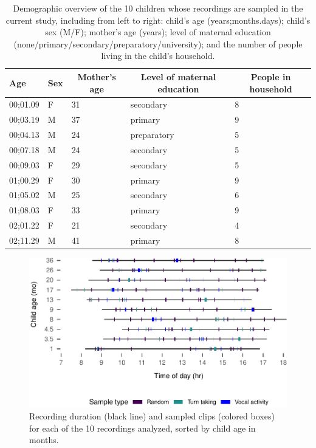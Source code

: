 \documentclass[,man,floatsintext]{apa6}
\begin{document}
\begin{table}[tbp]
\begin{center}
\begin{threeparttable}
\caption{\label{tab:tab1}Demographic overview of the 10 children whose recordings are sampled in the current study, including from left to right: child's age (years;months.days); child's sex (M/F); mother's age (years); level of maternal education (none/primary/secondary/preparatory/university); and the number of people living in the child's household.}
\begin{tabular}{lllll}
\toprule
Age & \multicolumn{1}{c}{Sex} & \multicolumn{1}{c}{Mother's age} & \multicolumn{1}{c}{Level of maternal education} & \multicolumn{1}{c}{People in household}\\
\midrule
00;01.09 & F & 31 & secondary & 8\\
00;03.19 & M & 37 & primary & 9\\
00;04.13 & M & 24 & preparatory & 5\\
00;07.18 & M & 24 & secondary & 5\\
00;09.03 & F & 29 & secondary & 5\\
01;00.29 & F & 30 & primary & 9\\
01;05.02 & M & 25 & secondary & 6\\
01;08.03 & F & 33 & primary & 9\\
02;01.22 & F & 21 & secondary & 4\\
02;11.29 & M & 41 & primary & 8\\
\bottomrule
\end{tabular}
\end{threeparttable}
\end{center}
\end{table}

\begin{figure}
\centering
\includegraphics{Yeli-CLE_files/figure-latex/fig1-1.pdf}
\caption{\label{fig:fig1}Recording duration (black line) and sampled clips
(colored boxes) for each of the 10 recordings analyzed, sorted by child
age in months.}
\end{figure}
\end{document}
